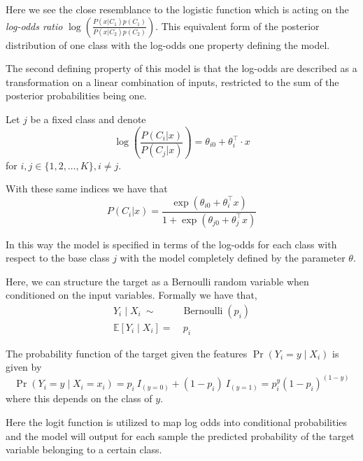 Here we see the close resemblance to the logistic function which is acting on the \textit{log-odds ratio} $ \log \left(  \frac{ P(x|C_1)p(C_1)}{P(x|C_2)p(C_2) } \right)$.
This equivalent form of the posterior distribution of one class with the log-odds one property defining the model.



The second defining property of this model is that the log-odds are described as a transformation on a linear combination of inputs, restricted to the sum of the posterior probabilities being one.

Let $j$ be a fixed class and denote
\begin{equation}
 \log \left( \frac{P(C_i|x)}{P(C_j|x)} \right) = \theta_{i0} + \theta_i^\intercal \cdot x
 \label{logit-logOddss}
 \end{equation}
for $i,j \in \{1,2,\ldots,K\}, i \neq j$.

With these same indices we have that
\begin{equation} P(C_i|x) = \frac{\exp(\theta_{i0} + \theta_i^\intercal x)}{1 + \exp(\theta_{j0} + \theta_j^\intercal x)}
\end{equation}

In this way the model is specified in terms of the log-odds for each class with respect to the base class $j$ with the model completely defined by the parameter $\theta$.

Here, we can structure the target as a Bernoulli random variable when conditioned on the input variables.
Formally we have that,
\begin{equation}
\begin{split}
Y_i \mid X_i \ \sim & \operatorname{Bernoulli}(p_i) \\
\mathbb{E}[Y_i \mid X_i ] = & \ p_i
\end{split}
\end{equation}


The probability function of the target given the features $\Pr(Y_i=y\mid X_i)$ is given by
\begin{equation}
\Pr(Y_i=y \mid X_i = x_i) = p_i \ I_{(y=0)} + (1-p_i) \ I_{(y=1)}  = p_i^{y} {(1-p_i)}^{(1-y)}
\label{logit-probabilityDensity}
\end{equation}
where this depends on the class of $y$.

Here the logit function is utilized to map log odds into conditional probabilities and the model will output for each sample the predicted probability of the target variable belonging to a certain class.

